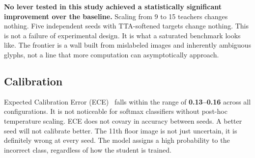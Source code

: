 \textbf{No lever tested in this study achieved a statistically
significant improvement over the baseline.} Scaling from 9 to 15 teachers changes nothing. Five independent seeds with TTA-softened targets change nothing. This is not a failure of experimental design. It is what a saturated benchmark looks like. The frontier is a wall built from mislabeled images and inherently ambiguous glyphs, not a line that more computation can asymptotically approach.


\subsection{Calibration}

Expected Calibration Error (ECE)~\cite{guo2017calibration} falls within the range of \textbf{0.13--0.16} across all \modelname{} configurations. It is not noticeable for softmax classifiers without post-hoc temperature scaling. ECE does not covary in accuracy between seeds. A better seed will not calibrate better. The 11th floor image is not just uncertain, it is definitely wrong at every seed. The model assigns a high probability to the incorrect class, regardless of how the student is trained.